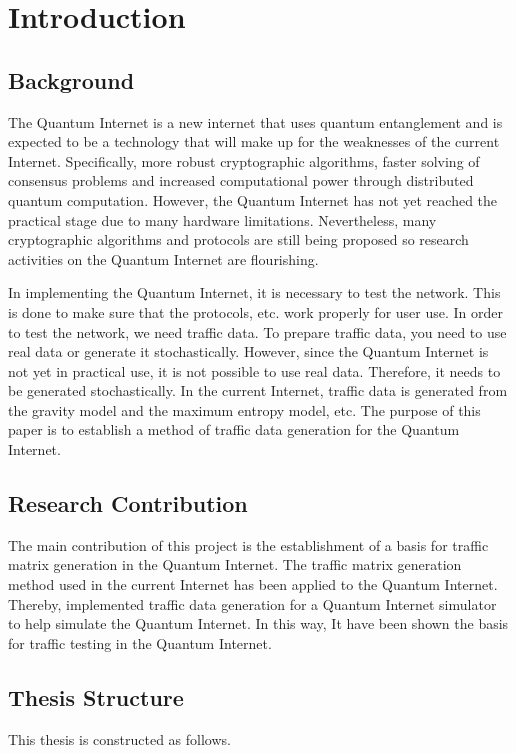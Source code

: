 \chapter{Introduction}
\label{introduction}

\section{Background}
\label{introduction:background}
The Quantum Internet is a new internet that uses quantum entanglement and is expected to be a technology that will make up for the weaknesses of the current Internet.
Specifically, more robust cryptographic algorithms, faster solving of consensus problems and increased computational power through distributed quantum computation. 
However, the Quantum Internet has not yet reached the practical stage due to many hardware limitations. 
Nevertheless, many cryptographic algorithms and protocols are still being proposed so research activities on the Quantum Internet are flourishing.

In implementing the Quantum Internet, it is necessary to test the network. 
This is done to make sure that the protocols, etc. work properly for user use. 
In order to test the network, we need traffic data. 
To prepare traffic data, you need to use real data or generate it stochastically.
However, since the Quantum Internet is not yet in practical use, it is not possible to use real data.
Therefore, it needs to be generated stochastically.
In the current Internet, traffic data is generated from the gravity model and the maximum entropy model, etc.
The purpose of this paper is to establish a method of traffic data generation for the Quantum Internet.

\section{Research Contribution}
\label{introduction:research_contribution}
The main contribution of this project is the establishment of a basis for traffic matrix generation in the Quantum Internet.
The traffic matrix generation method used in the current Internet has been applied to the Quantum Internet.
Thereby, implemented traffic data generation for a Quantum Internet simulator to help simulate the Quantum Internet.
In this way, It have been shown the basis for traffic testing in the Quantum Internet.

\section{Thesis Structure}
\label{introduction:thesis_structure}
This thesis is constructed as follows.

